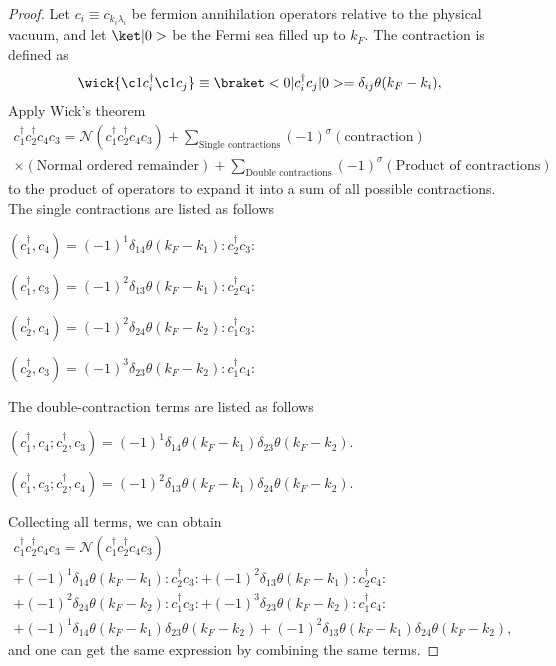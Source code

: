 \begin{solution}
\begin{proof}
  Let $c_i \equiv c_{k_i\lambda_i}$ be fermion annihilation operators relative
  to the physical vacuum, and let $\ket|0>$ be the Fermi sea filled up to $k_F$.
  The contraction is defined as
  \[
    \wick{\c1c_i^\dagger \c1c_j} \equiv \braket<0|c_i^\dagger c_j|0>
  = \delta_{ij} \theta(k_F - k_i),
  \]
  Apply Wick's theorem
  \begin{multline*}
    c_1^\dagger c_2^\dagger c_4 c_3
  = \mathcal N(c_1^\dagger c_2^\dagger c_4 c_3)
  + \sum_\text{Single contractions}
    (-1)^\sigma (\text{contraction}) \\
    \times (\text{Normal ordered remainder})
  + \sum_\text{Double contractions} (-1)^\sigma
    (\text{Product of contractions})
  \end{multline*}
  to the product of operators to expand it into a sum of
  all possible contractions. The single contractions are listed as follows
  \begin{enumext}[columns = 2]
    \item $(c_1^\dagger, c_4) = (-1)^1 \delta_{14}\theta(k_F - k_1)
          :c_2^\dagger c_3:$
    \item $(c_1^\dagger, c_3) = (-1)^2 \delta_{13}\theta(k_F - k_1)
          :c_2^\dagger c_4:$
    \item $(c_2^\dagger, c_4) = (-1)^2 \delta_{24}\theta(k_F - k_2)
          :c_1^\dagger c_3:$
    \item $(c_2^\dagger, c_3) = (-1)^3 \delta_{23}\theta(k_F - k_2)
          :c_1^\dagger c_4:$
  \end{enumext}
  The double-contraction terms are listed as follows
  \begin{enumext}
    \item $(c_1^\dagger,c_4; c_2^\dagger,c_3)
    = (-1)^1 \delta_{14}\theta(k_F - k_1) \delta_{23}\theta(k_F - k_2)$.
    \item $(c_1^\dagger,c_3; c_2^\dagger,c_4)
    = (-1)^2 \delta_{13}\theta(k_F - k_1) \delta_{24}\theta(k_F - k_2)$.
  \end{enumext}
  Collecting all terms, we can obtain
  \begin{multline*}
    c_1^\dagger c_2^\dagger c_4 c_3
  = \mathcal N(c_1^\dagger c_2^\dagger c_4 c_3)\\
  + (-1)^1 \delta_{14}\theta(k_F - k_1) :c_2^\dagger c_3:
  + (-1)^2 \delta_{13}\theta(k_F - k_1) :c_2^\dagger c_4:\\
  + (-1)^2 \delta_{24}\theta(k_F - k_2) :c_1^\dagger c_3:
  + (-1)^3 \delta_{23}\theta(k_F - k_2) :c_1^\dagger c_4:\\
  + (-1)^1 \delta_{14}\theta(k_F - k_1) \delta_{23}\theta(k_F - k_2)
  + (-1)^2 \delta_{13}\theta(k_F - k_1) \delta_{24}\theta(k_F - k_2),
  \end{multline*}
  and one can get the same expression by combining the same terms.
  \qedhere
\end{proof}
\end{solution}

